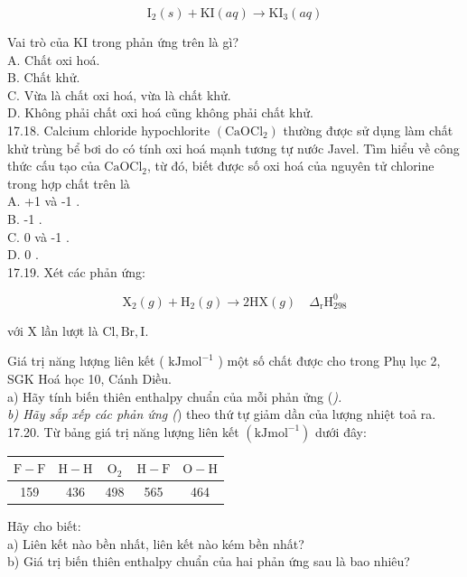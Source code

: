 \documentclass[10pt]{article}
\begin{document}
$$
\mathrm{I}_{2}(s)+\mathrm{KI}(a q) \rightarrow \mathrm{KI}_{3}(a q)
$$

Vai trò của KI trong phản ứng trên là gì?\\
A. Chất oxi hoá.\\
B. Chất khử.\\
C. Vừa là chất oxi hoá, vừa là chất khử.\\
D. Không phải chất oxi hoá cũng không phải chất khử.\\
17.18. Calcium chloride hypochlorite $\left(\mathrm{CaOCl}_{2}\right)$ thường được sử dụng làm chất khử trùng bể bơi do có tính oxi hoá mạnh tương tự nước Javel. Tìm hiểu về công thức cấu tạo của $\mathrm{CaOCl}_{2}$, từ đó, biết được số oxi hoá của nguyên tử chlorine trong hợp chất trên là\\
A. +1 và -1 .\\
B. -1 .\\
C. 0 và -1 .\\
D. 0 .\\
17.19. Xét các phản ứng:


\begin{equation*}
\mathrm{X}_{2}(g)+\mathrm{H}_{2}(g) \rightarrow 2 \mathrm{HX}(g) \quad \Delta_{\mathrm{r}} \mathrm{H}_{298}^{0} \tag{}
\end{equation*}


với X lần lượt là $\mathrm{Cl}, \mathrm{Br}, \mathrm{I}$.

Giá trị năng lượng liên kết ( $\mathrm{kJ} \mathrm{mol}^{-1}$ ) một số chất được cho trong Phụ lục 2, SGK Hoá học 10, Cánh Diều.\\
a) Hãy tính biến thiên enthalpy chuẩn của mỗi phản ửng (\textit{).\\
b) Hãy sắp xếp các phản ứng (}) theo thứ tự giảm dần của lượng nhiệt toả ra.\\
17.20. Từ bảng giá trị năng lượng liên kết $\left(\mathrm{kJ} \mathrm{mol}^{-1}\right)$ dưới đây:

\begin{center}
\begin{tabular}{|c|c|c|c|c|}
\hline
$\mathrm{F}-\mathrm{F}$ & $\mathrm{H}-\mathrm{H}$ & $\mathrm{O}_{2}$ & $\mathrm{H}-\mathrm{F}$ & $\mathrm{O}-\mathrm{H}$ \\
\hline
159 & 436 & 498 & 565 & 464 \\
\hline
\end{tabular}
\end{center}

Hãy cho biết:\\
a) Liên kết nào bền nhất, liên kết nào kém bền nhất?\\
b) Giá trị biến thiên enthalpy chuẩn của hai phản ứng sau là bao nhiêu?
\end{document}
